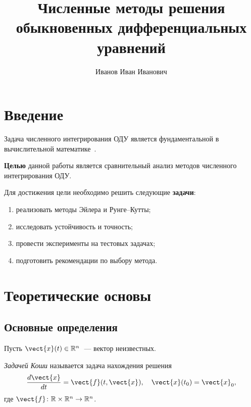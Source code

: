 \documentclass[font=modern]{cmcmsuthesis-cw}
\author{Иванов Иван Иванович}
\title{Численные методы решения обыкновенных
       дифференциальных уравнений}
\begin{document}
\maketitle
\tableofcontents

\section*{Введение}

Задача численного интегрирования ОДУ является фундаментальной
в вычислительной математике~\cite{shannon1948}.

\textbf{Целью} данной работы является сравнительный анализ методов
численного интегрирования ОДУ.

Для достижения цели необходимо решить следующие \textbf{задачи}:
\begin{enumerate}[beginpenalty=10000]
    \item реализовать методы Эйлера и Рунге--Кутты;
    \item исследовать устойчивость и точность;
    \item провести эксперименты на тестовых задачах;
    \item подготовить рекомендации по выбору метода.
\end{enumerate}

\section{Теоретические основы}
\label{sec:theory}

\subsection{Основные определения}

Пусть $\vect{x}(t) \in \mathbb{R}^n$~--- вектор неизвестных.

\begin{definition}\label{def:cauchy}
\emph{Задачей Коши} называется задача нахождения решения
\begin{equation}\label{eq:ode}
    \frac{d\vect{x}}{dt} = \vect{f}(t, \vect{x}),
    \quad \vect{x}(t_0) = \vect{x}_0,
\end{equation}
где $\vect{f}\colon \mathbb{R} \times \mathbb{R}^n \to \mathbb{R}^n$.
\end{definition}
\end{document}
